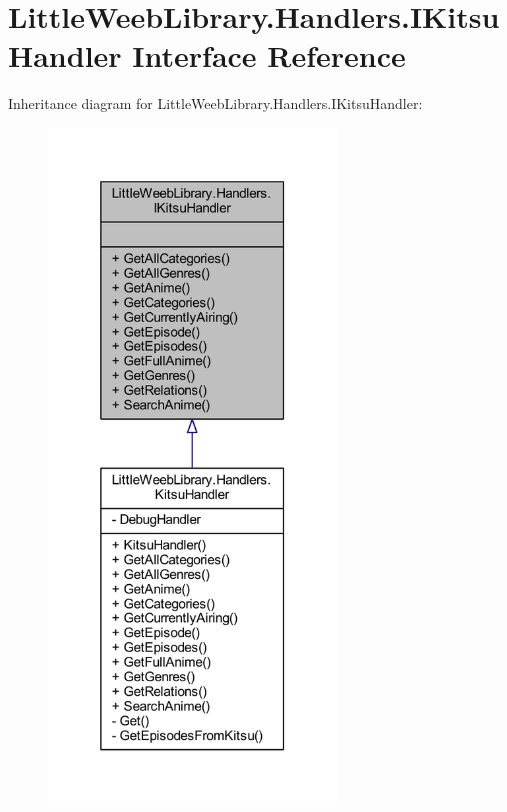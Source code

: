\hypertarget{interface_little_weeb_library_1_1_handlers_1_1_i_kitsu_handler}{}\section{Little\+Weeb\+Library.\+Handlers.\+I\+Kitsu\+Handler Interface Reference}
\label{interface_little_weeb_library_1_1_handlers_1_1_i_kitsu_handler}


Inheritance diagram for Little\+Weeb\+Library.\+Handlers.\+I\+Kitsu\+Handler\+:\nopagebreak
\begin{figure}[H]
\begin{center}
\leavevmode
\includegraphics[width=217pt]{interface_little_weeb_library_1_1_handlers_1_1_i_kitsu_handler__inherit__graph}
\end{center}
\end{figure}



